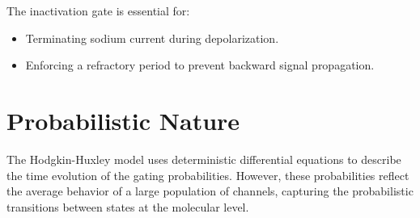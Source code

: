 \documentclass[12pt]{article}
\begin{document}
The inactivation gate is essential for:
\begin{itemize}
    \item Terminating sodium current during depolarization.
    \item Enforcing a refractory period to prevent backward signal propagation.
\end{itemize}

\section*{Probabilistic Nature}
The Hodgkin-Huxley model uses deterministic differential equations to describe the time evolution of the gating probabilities. However, these probabilities reflect the average behavior of a large population of channels, capturing the probabilistic transitions between states at the molecular level.
\end{document}
